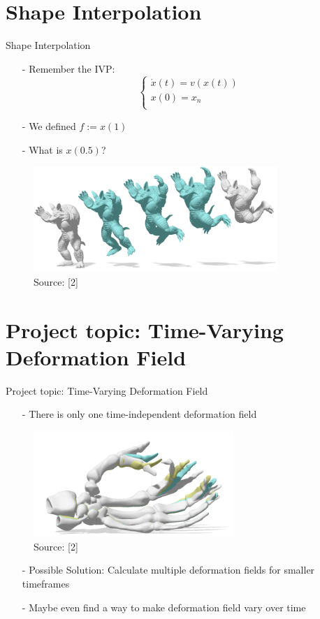 \documentclass[xcolor=dvipsnames]{beamer}
\begin{document}
\section{Shape Interpolation}
\begin{frame}{Shape Interpolation}
\begin{enumerate}
\item[-] Remember the IVP: \begin{equation*}
  	\begin{cases}
    \dot{x}(t) = v(x(t)) \\
    x(0) = x_n \\
    \end{cases}
    \end{equation*}
\item[-] We defined $f:=x(1)$
\item[-] What is $x(0.5)$?
\pause
\end{enumerate}
\begin{figure}
\includegraphics[height=4cm]{Pictures/Interpolation.png}
\caption*{Source: [2]}
\end{figure}
\end{frame}

\section{Project topic: Time-Varying Deformation Field}
\begin{frame}{Project topic: Time-Varying Deformation Field}
\begin{enumerate}
\item[-] There is only one time-independent deformation field
\end{enumerate}
\begin{figure}
\includegraphics[height=4cm]{Pictures/hand.png}
\caption*{Source: [2]}
\end{figure}
\begin{enumerate}
\item[-] Possible Solution: Calculate multiple deformation fields for smaller timeframes
\item[-] Maybe even find a way to make deformation field vary over time
\end{enumerate}
\end{frame}
\end{document}
